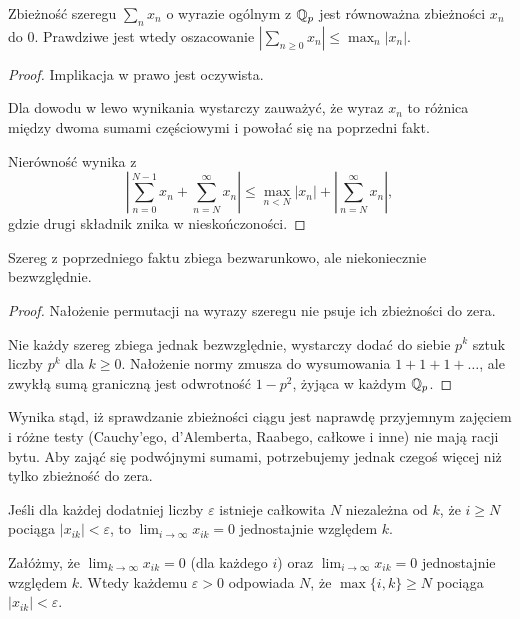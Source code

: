 \begin{fakt} \label{ingentis} %
	Zbieżność szeregu $\sum_n x_n$ o wyrazie ogólnym z $\mathbb Q_p$ jest równoważna zbieżności $x_n$ do $0$.
	Prawdziwe jest wtedy oszacowanie $|\sum_{n \ge 0} x_n| \le \max_n |x_n|$.
\end{fakt}

\begin{proof}
	Implikacja w prawo jest oczywista.
	
	Dla dowodu w lewo wynikania wystarczy zauważyć, że wyraz $x_n$ to różnica między dwoma sumami częściowymi i powołać się na poprzedni fakt.

	Nierówność wynika z
	\[
		\left|\sum_{n = 0}^{N-1} x_n + \sum_{n = N}^\infty x_n\right| \le \max_{n < N} |x_n| + \left|\sum_{n = N}^\infty x_n\right|,
	\] gdzie drugi składnik znika w nieskończoności.
\end{proof}

\begin{wniosek}
	Szereg z poprzedniego faktu zbiega bezwarunkowo, ale niekoniecznie bezwzględnie.
\end{wniosek}

\begin{proof}
	Nałożenie permutacji na wyrazy szeregu nie psuje ich zbieżności do zera.

	Nie każdy szereg zbiega jednak bezwzględnie, wystarczy dodać do siebie $p^k$ sztuk liczby $p^k$ dla $k \ge 0$.
	Nałożenie normy zmusza do wysumowania $1 + 1 + 1 + \ldots$, ale zwykłą sumą graniczną jest odwrotność $1 - p^2$, żyjąca w każdym $\mathbb Q_p$.
\end{proof}

Wynika stąd, iż sprawdzanie zbieżności ciągu jest naprawdę przyjemnym zajęciem i różne testy (Cauchy'ego, d'Alemberta, Raabego, całkowe i inne) nie mają racji bytu.
Aby zająć się podwójnymi sumami, potrzebujemy jednak czegoś więcej niż tylko zbieżność do zera.

\begin{definicja}
	Jeśli dla każdej dodatniej liczby $\varepsilon$ istnieje całkowita $N$ niezależna od $k$, że $i \ge N$ pociąga $|x_{ik}| < \varepsilon$, to $\lim_{i \to \infty} x_{ik} = 0$ jednostajnie względem $k$.
\end{definicja}

\begin{lemat} \label{veteris}
	Załóżmy, że $\lim_{k \to \infty} x_{ik} = 0$ (dla każdego $i$) oraz $\lim_{i \to \infty} x_{ik} = 0$ jednostajnie względem $k$.
	Wtedy każdemu $\varepsilon > 0$ odpowiada $N$, że $\max \{i, k\} \ge N$ pociąga $|x_{ik}| < \varepsilon$.
\end{lemat}

